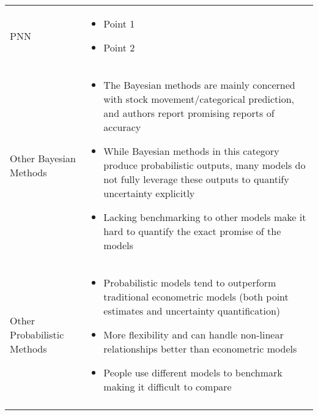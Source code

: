 \begin{table}[H]
\begin{adjustbox}{width=1\textwidth,center}
\begin{tabular}{p{}p{}}
        \addlinespace
        \hdashline[0.2pt/3pt]
        \addlinespace
        PNN & 
        \begin{itemize}[left=0pt]
        \vspace{-4mm}
            \item Point 1
            \item Point 2
        \end{itemize}\\
        \addlinespace
        \hdashline[0.2pt/3pt]
        \addlinespace
        Other Bayesian Methods & 
        \vspace{-4mm}
        \begin{itemize}[left=0pt]
            \item The Bayesian methods are mainly concerned with stock movement/categorical prediction, and authors report promising reports of accuracy
            \item While Bayesian methods in this category produce probabilistic outputs, many models do not fully leverage these outputs to quantify uncertainty explicitly
            \item Lacking benchmarking to other models make it hard to quantify the exact promise of the models
        \end{itemize}\\
        \hdashline[0.2pt/3pt]
        \addlinespace
        Other Probabilistic Methods & 
        \vspace{-4mm}
        \begin{itemize}[left=0pt]
            \item Probabilistic models tend to outperform traditional econometric models (both point estimates and uncertainty quantification)
            \item More flexibility and can handle non-linear relationships better than econometric models
            \item People use different models to benchmark making it difficult to compare
        \end{itemize} \\
        \addlinespace
        \addlinespace
        \bottomrule
    \end{tabular}
    \end{adjustbox}
\end{table}
